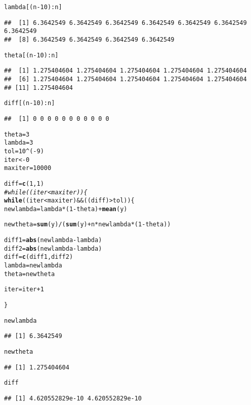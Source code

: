 \documentclass{article}\usepackage[]{graphicx}\usepackage[]{color}
\makeatletter
\newcommand{\hlnum}[1]{\textcolor[rgb]{0.686,0.059,0.569}{#1}}%
\newcommand{\hlcom}[1]{\textcolor[rgb]{0.678,0.584,0.686}{\textit{#1}}}%
\newcommand{\hlopt}[1]{\textcolor[rgb]{0,0,0}{#1}}%
\newcommand{\hlstd}[1]{\textcolor[rgb]{0.345,0.345,0.345}{#1}}%
\newcommand{\hlkwa}[1]{\textcolor[rgb]{0.161,0.373,0.58}{\textbf{#1}}}%
\newcommand{\hlkwb}[1]{\textcolor[rgb]{0.69,0.353,0.396}{#1}}%
\newcommand{\hlkwd}[1]{\textcolor[rgb]{0.737,0.353,0.396}{\textbf{#1}}}%
\newenvironment{kframe}{%
 \def\at@end@of@kframe{}%
 \ifinner\ifhmode%
  \def\at@end@of@kframe{\end{minipage}}%
  \begin{minipage}{\columnwidth}%
 \fi\fi%
 \def\FrameCommand##1{\hskip\@totalleftmargin \hskip-\fboxsep
 \colorbox{shadecolor}{##1}\hskip-\fboxsep
     \hskip-\linewidth \hskip-\@totalleftmargin \hskip\columnwidth}%
 \MakeFramed {\advance\hsize-\width
   \@totalleftmargin\z@ \linewidth\hsize
   \@setminipage}}%
 {\par\unskip\endMakeFramed%
 \at@end@of@kframe}
\newenvironment{knitrout}{}{} %
\makeatother
\begin{document}
\begin{knitrout}
\begin{kframe}
\begin{alltt}
\hlstd{lambda[(n}\hlopt{-}\hlnum{10}\hlstd{)}\hlopt{:}\hlstd{n]}
\end{alltt}
\begin{verbatim}
##  [1] 6.3642549 6.3642549 6.3642549 6.3642549 6.3642549 6.3642549 6.3642549
##  [8] 6.3642549 6.3642549 6.3642549 6.3642549
\end{verbatim}
\begin{alltt}
\hlstd{theta[(n}\hlopt{-}\hlnum{10}\hlstd{)}\hlopt{:}\hlstd{n]}
\end{alltt}
\begin{verbatim}
##  [1] 1.275404604 1.275404604 1.275404604 1.275404604 1.275404604
##  [6] 1.275404604 1.275404604 1.275404604 1.275404604 1.275404604
## [11] 1.275404604
\end{verbatim}
\begin{alltt}
\hlstd{diff[(n}\hlopt{-}\hlnum{10}\hlstd{)}\hlopt{:}\hlstd{n]}
\end{alltt}
\begin{verbatim}
##  [1] 0 0 0 0 0 0 0 0 0 0 0
\end{verbatim}
\begin{alltt}
\hlstd{theta}\hlkwb{=}\hlnum{3}
\hlstd{lambda}\hlkwb{=}\hlnum{3}
\hlstd{tol}\hlkwb{=}\hlnum{10}\hlopt{^}\hlstd{(}\hlopt{-}\hlnum{9}\hlstd{)}
\hlstd{iter}\hlkwb{<-}\hlnum{0}
\hlstd{maxiter}\hlkwb{=}\hlnum{10000}

\hlstd{diff}\hlkwb{=}\hlkwd{c}\hlstd{(}\hlnum{1}\hlstd{,}\hlnum{1}\hlstd{)}
\hlcom{#while((iter<maxiter))\{  }
\hlkwa{while}\hlstd{((iter}\hlopt{<}\hlstd{maxiter)}\hlopt{&&}\hlstd{((diff)}\hlopt{>}\hlstd{tol))\{}
    \hlstd{newlambda} \hlkwb{=}\hlstd{lambda}\hlopt{*}\hlstd{(}\hlnum{1}\hlopt{-}\hlstd{theta)}\hlopt{+}\hlkwd{mean}\hlstd{(y)}

    \hlstd{newtheta}\hlkwb{=}\hlkwd{sum}\hlstd{(y)}\hlopt{/}\hlstd{(}\hlkwd{sum}\hlstd{(y)}\hlopt{+}\hlstd{n}\hlopt{*}\hlstd{newlambda}\hlopt{*}\hlstd{(}\hlnum{1}\hlopt{-}\hlstd{theta))}


    \hlstd{diff1}\hlkwb{=}\hlkwd{abs}\hlstd{(newlambda}\hlopt{-}\hlstd{lambda)}
    \hlstd{diff2}\hlkwb{=}\hlkwd{abs}\hlstd{(newlambda}\hlopt{-}\hlstd{lambda)}
    \hlstd{diff}\hlkwb{=}\hlkwd{c}\hlstd{(diff1,diff2)}
    \hlstd{lambda}\hlkwb{=}\hlstd{newlambda}
    \hlstd{theta}\hlkwb{=}\hlstd{newtheta}

    \hlstd{iter}\hlkwb{=}\hlstd{iter}\hlopt{+}\hlnum{1}


  \hlstd{\}}

\hlstd{newlambda}
\end{alltt}
\begin{verbatim}
## [1] 6.3642549
\end{verbatim}
\begin{alltt}
\hlstd{newtheta}
\end{alltt}
\begin{verbatim}
## [1] 1.275404604
\end{verbatim}
\begin{alltt}
\hlstd{diff}
\end{alltt}
\begin{verbatim}
## [1] 4.620552829e-10 4.620552829e-10
\end{verbatim}
\end{kframe}
\end{knitrout}
\end{document}
